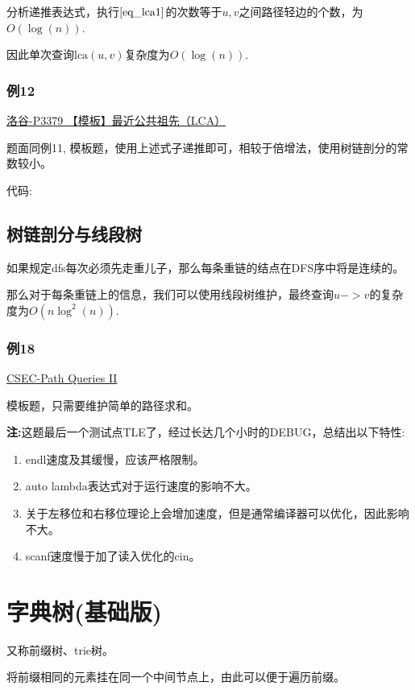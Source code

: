 \documentclass{article}
\newcommand{\lca}{\text{lca}}
\newcommand{\inputcppfile}[1]{}
\begin{document}
分析递推表达式，执行$\ref{eq_lca1}$的次数等于$u,v$之间路径轻边的个数，为$O(\log(n))$.

因此单次查询$\lca(u,v)$复杂度为$O(\log(n))$.

\subsubsection{例12}
\href{https://www.luogu.com.cn/problem/P3379}{洛谷-P3379 【模板】最近公共祖先（LCA）}

题面同例11, 模板题，使用上述式子递推即可，相较于倍增法，使用树链剖分的常数较小。

代码:
\inputcppfile{Code_12.cpp}

\subsection{树链剖分与线段树}

如果规定dfs每次必须先走重儿子，那么每条重链的结点在DFS序中将是连续的。

那么对于每条重链上的信息，我们可以使用线段树维护，最终查询$u->v$的复杂度为$O(n\log^2(n))$.

\subsubsection{例18}
\href{https://cses.fi/problemset/task/2134/}{CSEC-Path Queries II}

模板题，只需要维护简单的路径求和。

\textbf{注:}这题最后一个测试点TLE了，经过长达几个小时的DEBUG，总结出以下特性:

\begin{enumerate}
    \item endl速度及其缓慢，应该严格限制。
    \item auto lambda表达式对于运行速度的影响不大。
    \item 关于左移位和右移位理论上会增加速度，但是通常编译器可以优化，因此影响不大。
    \item scanf速度慢于加了读入优化的cin。
\end{enumerate}

\inputcppfile{Code_18.cpp}

\section{字典树(基础版)}
又称前缀树、trie树。

将前缀相同的元素挂在同一个中间节点上，由此可以便于遍历前缀。
\end{document}
